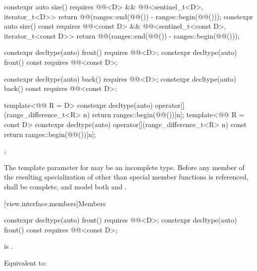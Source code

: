 \begin{codeblock}
{{    constexpr auto size() requires @@<D> &&
      @@<sentinel_t<D>, iterator_t<D>> {
        return @@(ranges::end(@@()) - ranges::begin(@@()));
      }
    constexpr auto size() const requires @@<const D> &&
      @@<sentinel_t<const D>, iterator_t<const D>> {
        return @@(ranges::end(@@()) - ranges::begin(@@()));
      }

    constexpr decltype(auto) front() requires @@<D>;
    constexpr decltype(auto) front() const requires @@<const D>;

    constexpr decltype(auto) back() requires @@<D>;
    constexpr decltype(auto) back() const requires @@<const D>;

    template<@@ R = D>
      constexpr decltype(auto) operator[](range_difference_t<R> n) {
        return ranges::begin(@@())[n];
      }
    template<@@ R = const D>
      constexpr decltype(auto) operator[](range_difference_t<R> n) const {
        return ranges::begin(@@())[n];
      }
  };
}
\end{codeblock}

\pnum
The template parameter  for  may be an
incomplete type. Before any member of the resulting specialization of
 other than special member functions
is referenced,  shall be complete, and
model both  and .

[view.interface.members]{Members}

%
\begin{itemdecl}
constexpr decltype(auto) front() requires @@<D>;
constexpr decltype(auto) front() const requires @@<const D>;
\end{itemdecl}

\begin{itemdescr}
\pnum
\expects
{} is .

\pnum
\effects
Equivalent to: 
\end{itemdescr}

